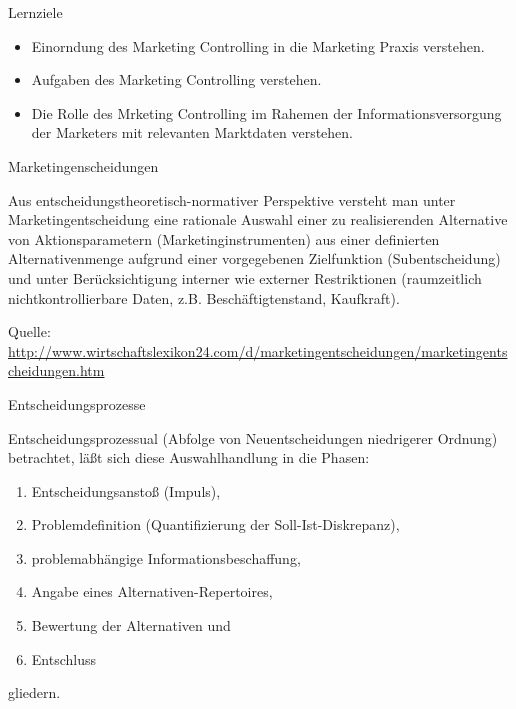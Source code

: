\documentclass[12pt,ngerman,a4paper,ignorenonframetext,]{beamer}
\providecommand{\tightlist}{%
  \setlength{\itemsep}{0pt}\setlength{\parskip}{0pt}}
\begin{document}
\begin{frame}{Lernziele}
\protect\hypertarget{lernziele}{}

\begin{itemize}
\tightlist
\item
  Einorndung des Marketing Controlling in die Marketing Praxis
  verstehen.
\item
  Aufgaben des Marketing Controlling verstehen.
\item
  Die Rolle des Mrketing Controlling im Rahemen der
  Informationsversorgung der Marketers mit relevanten Marktdaten
  verstehen.
\end{itemize}

\end{frame}

\begin{frame}{Marketingenscheidungen}
\protect\hypertarget{marketingenscheidungen}{}

Aus entscheidungstheoretisch-normativer Perspektive versteht man unter
Marketingentscheidung eine rationale Auswahl einer zu realisierenden
Alternative von Aktionsparametern (Marketinginstrumenten) aus einer
definierten Alternativenmenge aufgrund einer vorgegebenen Zielfunktion
(Subentscheidung) und unter Berücksichtigung interner wie externer
Restriktionen (raumzeitlich nichtkontrollierbare Daten, z.\thinspace{}B.
Beschäftigtenstand, Kaufkraft).

Quelle:
\url{http://www.wirtschaftslexikon24.com/d/marketingentscheidungen/marketingentscheidungen.htm}

\end{frame}

\begin{frame}{Entscheidungsprozesse}
\protect\hypertarget{entscheidungsprozesse}{}

Entscheidungsprozessual (Abfolge von Neuentscheidungen niedrigerer
Ordnung) betrachtet, läßt sich diese Auswahlhandlung in die Phasen:

\begin{enumerate}
\tightlist
\item
  Entscheidungsanstoß (Impuls),
\item
  Problemdefinition (Quantifizierung der Soll-Ist-Diskrepanz),
\item
  problemabhängige Informationsbeschaffung,
\item
  Angabe eines Alternativen-Repertoires,
\item
  Bewertung der Alternativen und
\item
  Entschluss
\end{enumerate}

gliedern.

\end{frame}
\end{document}
